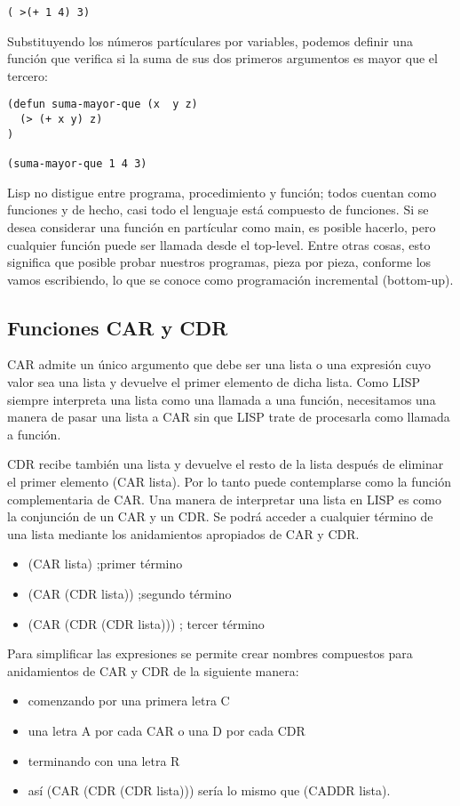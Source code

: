 \documentclass[11pt]{article}
\begin{document}
\begin{verbatim}
( >(+ 1 4) 3)
\end{verbatim}

Substituyendo los números partículares por variables, podemos definir
una función que verifica si la suma de sus dos primeros argumentos es
mayor que el tercero:

\begin{verbatim}
(defun suma-mayor-que (x  y z)
  (> (+ x y) z)
)

(suma-mayor-que 1 4 3)
\end{verbatim}

Lisp no distigue entre programa, procedimiento y función; todos cuentan
como funciones y de hecho, casi todo el lenguaje está compuesto de funciones. Si se desea considerar una función en partícular como main, es posible
hacerlo, pero cualquier función puede ser llamada desde el top-level. Entre
otras cosas, esto significa que posible probar nuestros programas, pieza por
pieza, conforme los vamos escribiendo, lo que se conoce como programación
incremental (bottom-up).

\subsection*{Funciones CAR y CDR}
\label{sec:org9cac572}


CAR admite un único argumento que debe ser una lista o una expresión
cuyo valor sea una lista y devuelve el primer elemento de dicha
lista. Como LISP siempre interpreta una lista como una llamada a una
función, necesitamos una manera de pasar una lista a CAR sin que LISP
trate de procesarla como llamada a función.

CDR recibe también una lista y devuelve el resto de la lista después
de eliminar el primer elemento (CAR lista). Por lo tanto puede
contemplarse como la función complementaria de CAR. Una manera de
interpretar una lista en LISP es como la conjunción de un CAR y un
CDR. Se podrá acceder a cualquier término de una lista mediante los
anidamientos apropiados de CAR y CDR.  

\begin{itemize}
\item (CAR lista) ;primer término
\item (CAR (CDR lista)) ;segundo término
\item (CAR (CDR (CDR lista))) ; tercer término
\end{itemize}

Para simplificar las expresiones se permite crear 
nombres compuestos
para anidamientos de CAR y CDR de la siguiente manera:
\begin{itemize}
\item comenzando por una primera letra C
\item una letra A por cada CAR o una D por cada CDR
\item terminando con una letra R
\item así (CAR (CDR (CDR lista))) sería lo mismo que (CADDR lista).
\end{itemize}
\end{document}

